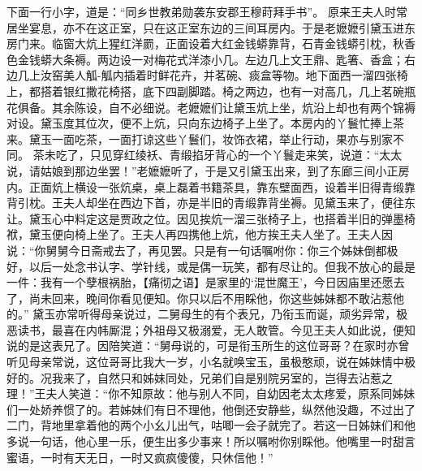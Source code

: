 \documentclass[12pt,oneside]{book}
\begin{document}
下面一行小字，道是：“同乡世教弟勋袭东安郡王穆莳拜手书”。
原来王夫人时常居坐宴息，亦不在这正室，只在这正室东边的三间耳房内。于是老嬷嬷引黛玉进东房门来。临窗大炕上猩红洋罽，正面设着大红金钱蟒靠背，石青金钱蟒引枕，秋香色金钱蟒大条褥。两边设一对梅花式洋漆小几。左边几上文王鼎、匙箸、香盒；右边几上汝窑美人觚-觚内插着时鲜花卉，并茗碗、痰盒等物。地下面西一溜四张椅上，都搭着银红撒花椅搭，底下四副脚踏。椅之两边，也有一对高几，几上茗碗瓶花俱备。其余陈设，自不必细说。老嬷嬷们让黛玉炕上坐，炕沿上却也有两个锦褥对设。黛玉度其位次，便不上炕，只向东边椅子上坐了。本房内的丫鬟忙捧上茶来。黛玉一面吃茶，一面打谅这些丫鬟们，妆饰衣裙，举止行动，果亦与别家不同。
茶未吃了，只见穿红绫袄、青缎掐牙背心的一个丫鬟走来笑，说道：“太太说，请姑娘到那边坐罢！”老嬷嬷听了，于是又引黛玉出来，到了东廊三间小正房内。正面炕上横设一张炕桌，桌上磊着书籍茶具，靠东壁面西，设着半旧得青缎靠背引枕。王夫人却坐在西边下首，亦是半旧的青缎靠背坐褥。见黛玉来了，便往东让。黛玉心中料定这是贾政之位。因见挨炕一溜三张椅子上，也搭着半旧的弹墨椅袱，黛玉便向椅上坐了。王夫人再四携他上炕，他方挨王夫人坐了。王夫人因说：“你舅舅今日斋戒去了，再见罢。只是有一句话嘱咐你：你三个姊妹倒都极好，以后一处念书认字、学针线，或是偶一玩笑，都有尽让的。但我不放心的最是一件：我有一个孽根祸胎，【痛彻之语】是家里的‘混世魔王’，今日因庙里还愿去了，尚未回来，晚间你看见便知。你只以后不用睬他，你这些姊妹都不敢沾惹他的。”
黛玉亦常听得母亲说过，二舅母生的有个表兄，乃衔玉而诞，顽劣异常，极恶读书，最喜在内帏厮混；外祖母又极溺爱，无人敢管。今见王夫人如此说，便知说的是这表兄了。因陪笑道：“舅母说的，可是衔玉所生的这位哥哥？在家时亦曾听见母亲常说，这位哥哥比我大一岁，小名就唤宝玉，虽极憨顽，说在姊妹情中极好的。况我来了，自然只和姊妹同处，兄弟们自是别院另室的，岂得去沾惹之理！”王夫人笑道：“你不知原故：他与别人不同，自幼因老太太疼爱，原系同姊妹们一处娇养惯了的。若姊妹们有日不理他，他倒还安静些，纵然他没趣，不过出了二门，背地里拿着他的两个小幺儿出气，咕唧一会子就完了。若这一日姊妹们和他多说一句话，他心里一乐，便生出多少事来！所以嘱咐你别睬他。他嘴里一时甜言蜜语，一时有天无日，一时又疯疯傻傻，只休信他！”
\end{document}
